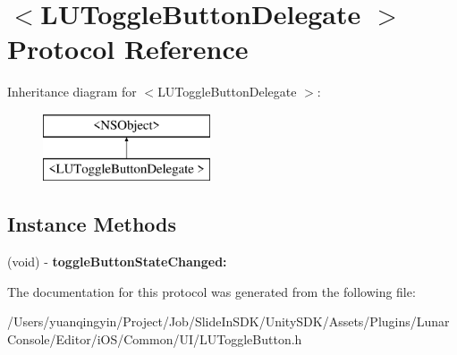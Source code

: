 \hypertarget{protocol_l_u_toggle_button_delegate_01-p}{}\section{$<$L\+U\+Toggle\+Button\+Delegate $>$ Protocol Reference}
\label{protocol_l_u_toggle_button_delegate_01-p}
Inheritance diagram for $<$L\+U\+Toggle\+Button\+Delegate $>$\+:\begin{figure}[H]
\begin{center}
\leavevmode
\includegraphics[height=2.000000cm]{protocol_l_u_toggle_button_delegate_01-p}
\end{center}
\end{figure}
\subsection*{Instance Methods}
\begin{DoxyCompactItemize}
\item 
\mbox{\label{protocol_l_u_toggle_button_delegate_01-p_adb7ced4ad6e3ed51e6557031f68d3476}} 
(void) -\/ {\bfseries toggle\+Button\+State\+Changed\+:}
\end{DoxyCompactItemize}


The documentation for this protocol was generated from the following file\+:\begin{DoxyCompactItemize}
\item 
/\+Users/yuanqingyin/\+Project/\+Job/\+Slide\+In\+S\+D\+K/\+Unity\+S\+D\+K/\+Assets/\+Plugins/\+Lunar\+Console/\+Editor/i\+O\+S/\+Common/\+U\+I/L\+U\+Toggle\+Button.\+h\end{DoxyCompactItemize}
